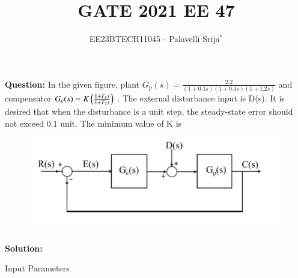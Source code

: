\documentclass[journal,12pt,twocolumn]{IEEEtran}
\theoremstyle{remark}
\begin{document}
{\small


\vspace{3cm}

\title{GATE 2021 EE 47}
\author{EE23BTECH11045 - Palavelli Srija$^{*}$}

\maketitle

\bigskip

\renewcommand{\thefigure}{\theenumi}
\renewcommand{\thetable}{\theenumi}

\vspace{3cm}
\textbf{Question:} 
In the given figure, plant $G_p(s)=\frac{2.2}{(1+0.1s)(1+0.4s)(1+1.2s)}$ and compensator $G_c(s)=K\left(\frac{1+T_1s}{1+T_2s}\right)$ . The external disturbance input is D(s). It is desired that when the disturbance is a unit step, the steady-state error should not exceed 0.1 unit. The minimum value of K is
\begin{figure}[h!]
    \centering
    \includegraphics[width=\columnwidth]{figs/fig.png}
    \caption{}
    \label{fig:sr40}
\end{figure}
\\
\textbf{Solution:}\\
\begin{table}[h!]
    \centering
    
    \caption{Input Parameters}
    \label{tab:table_omega}
\end{table}
 
}
\end{document}

